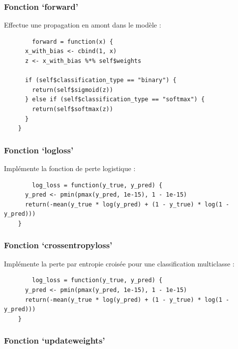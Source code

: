 \documentclass[10pt,french]{report}
\begin{document}
	\subsubsection{Fonction \enquote*{forward}}

    Effectue une propagation en amont dans le modèle :
    \begin{verbatim}
        forward = function(x) {
      x_with_bias <- cbind(1, x)
      z <- x_with_bias %*% self$weights

      if (self$classification_type == "binary") {
        return(self$sigmoid(z))
      } else if (self$classification_type == "softmax") {
        return(self$softmax(z))
      }
    }
    \end{verbatim}

    \subsubsection{Fonction \enquote*{log\textunderscore loss}}

    Implémente la fonction de perte logistique :
    \begin{verbatim}
        log_loss = function(y_true, y_pred) {
      y_pred <- pmin(pmax(y_pred, 1e-15), 1 - 1e-15)
      return(-mean(y_true * log(y_pred) + (1 - y_true) * log(1 - y_pred)))
    }
    \end{verbatim}

	\subsubsection{Fonction \enquote*{cross\textunderscore entropy\textunderscore loss}}

    Implémente la perte par entropie croisée pour une classification multiclasse :
    \begin{verbatim}
        log_loss = function(y_true, y_pred) {
      y_pred <- pmin(pmax(y_pred, 1e-15), 1 - 1e-15)
      return(-mean(y_true * log(y_pred) + (1 - y_true) * log(1 - y_pred)))
    }
    \end{verbatim}

	\subsubsection{Fonction \enquote*{update\textunderscore weights}}
\end{document}
